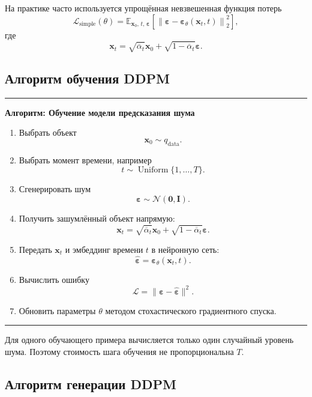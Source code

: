 \documentclass[12pt,a4paper]{article}
\theoremstyle{definition}
\newcommand{\E}{\mathbb{E}}
\newcommand{\N}{\mathcal{N}}
\newcommand{\eps}{\varepsilon}
\newcommand{\1}{\mathbf{1}}
\newenvironment{algorithmbox}[1]
{
    \begin{center}
    \begin{minipage}{0.95\textwidth}
    \hrule
    \medskip
    \textbf{Алгоритм: #1}
    \begin{enumerate}[leftmargin=*,label=\arabic*.]
}
{
    \end{enumerate}
    \medskip
    \hrule
    \end{minipage}
    \end{center}
}
\begin{document}
На практике часто используется упрощённая невзвешенная функция потерь
\[
    \mathcal{L}_{\text{simple}}(\theta)
    =
    \E_{
        \bm{x}_0,\,
        t,\,
        \bm{\eps}
    }
    \left[
        \left\|
            \bm{\eps}
            -
            \bm{\eps}_\theta(\bm{x}_t,t)
        \right\|_2^2
    \right],
\]
где
\[
    \bm{x}_t
    =
    \sqrt{\overline{\alpha}_t}\bm{x}_0
    +
    \sqrt{1-\overline{\alpha}_t}\bm{\eps}.
\]

\subsection{Алгоритм обучения DDPM}

\begin{algorithmbox}{Обучение модели предсказания шума}
    \item Выбрать объект
    \[
        \bm{x}_0\sim q_{\text{data}}.
    \]
    \item Выбрать момент времени, например
    \[
        t\sim\operatorname{Uniform}\{1,\ldots,T\}.
    \]
    \item Сгенерировать шум
    \[
        \bm{\eps}\sim\N(\bm{0},\bm{I}).
    \]
    \item Получить зашумлённый объект напрямую:
    \[
        \bm{x}_t
        =
        \sqrt{\overline{\alpha}_t}\bm{x}_0
        +
        \sqrt{1-\overline{\alpha}_t}\bm{\eps}.
    \]
    \item Передать $\bm{x}_t$ и эмбеддинг времени $t$ в нейронную сеть:
    \[
        \widehat{\bm{\eps}}
        =
        \bm{\eps}_\theta(\bm{x}_t,t).
    \]
    \item Вычислить ошибку
    \[
        \mathcal{L}
        =
        \|\bm{\eps}-\widehat{\bm{\eps}}\|^2.
    \]
    \item Обновить параметры $\theta$ методом стохастического
    градиентного спуска.
\end{algorithmbox}

Для одного обучающего примера вычисляется только один случайный уровень
шума. Поэтому стоимость шага обучения не пропорциональна $T$.

\subsection{Алгоритм генерации DDPM}
\end{document}
